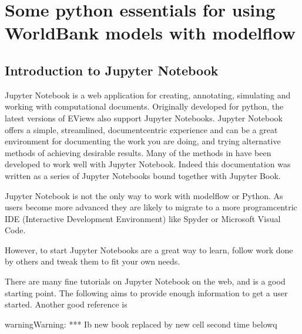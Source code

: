 \documentclass[letterpaper,10pt,english]{jupyterBook}
\begin{document}
\sphinxstepscope


\part{Some python essentials for using WorldBank models with modelflow}

\sphinxstepscope


\chapter{Introduction to  Jupyter Notebook}
\label{\detokenize{content/04_PythonEssentials/Intro_Jupyter_notebook:introduction-to-jupyter-notebook}}\label{\detokenize{content/04_PythonEssentials/Intro_Jupyter_notebook::doc}}
\sphinxAtStartPar
Jupyter Notebook is a web application for creating, annotating, simulating and working with computational documents.  Originally developed for python, the latest versions of EViews also support Jupyter Notebooks. Jupyter Notebook offers a simple, streamlined, document\sphinxhyphen{}centric experience and can be a great environment for documenting the work you are doing, and trying alternative methods of achieving desirable results.  Many of the methods in  have been developed to work well with Jupyter Notebook. Indeed this documentation was written as a series of Jupyter Notebooks bound together with Jupyter Book.

\sphinxAtStartPar
Jupyter Notebook is not the only way to work with modelflow or Python.  As users become more advanced they are likely to migrate to a more program\sphinxhyphen{}centric IDE (Interactive Development Environment) like Spyder or Microsoft Visual Code.

\sphinxAtStartPar
However, to start Jupyter Notebooks are a great way to learn, follow work done by others and tweak them to fit your own needs.

\sphinxAtStartPar
There are many fine tutorials on Jupyter Notebook on the web, and  is a good starting point. The following aims to provide enough information to get a user started.  Another good reference is 

\begin{sphinxadmonition}{warning}{Warning:}
\sphinxAtStartPar
*** Ib new book replaced by new cell second time belowq
\end{sphinxadmonition}
\end{document}
